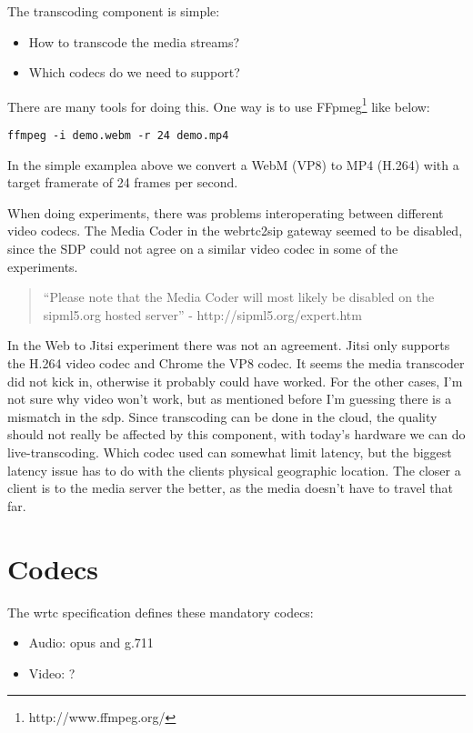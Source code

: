 The transcoding component is simple:

\begin{itemize}
\item{How to transcode the media streams?}
\item{Which codecs do we need to support?}
\end{itemize}

There are many tools for doing this. One way is to use FFpmeg\footnote{http://www.ffmpeg.org/} like below:

\begin{lstlisting}
ffmpeg -i demo.webm -r 24 demo.mp4
\end{lstlisting}

In the simple examplea above we convert a WebM (VP8) to MP4 (H.264) with a target framerate of 24 frames per second.

When doing experiments, there was problems interoperating between different video codecs. The Media Coder in the webrtc2sip gateway seemed to be disabled, since the SDP could not agree on a similar video codec in some of the experiments.

\begin{quote}
``Please note that the Media Coder will most likely be disabled on the sipml5.org hosted server'' - http://sipml5.org/expert.htm
\end{quote}

In the Web to Jitsi experiment there was not an agreement. Jitsi only supports the H.264 video codec and Chrome the VP8 codec. It seems the media transcoder did not kick in, otherwise it probably could have worked. For the other cases, I'm not sure why video won't work, but as mentioned before I'm guessing there is a mismatch in the \gls{sdp}. Since transcoding can be done in the cloud, the quality should not really be affected by this component, with today's hardware we can do live-transcoding. Which codec used can somewhat limit latency, but the biggest latency issue has to do with the clients physical geographic location. The closer a client is to the media server the better, as the media doesn't have to travel that far.

\section{Codecs}

The \gls{wrtc} specification defines these mandatory codecs:
\begin{itemize}
    \item Audio: opus and g.711
    \item Video: ?
\end{itemize}

